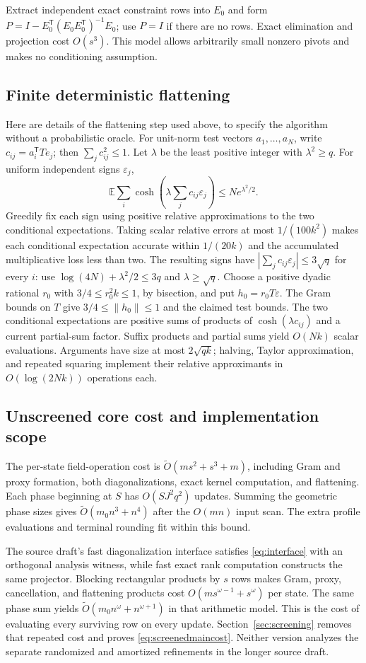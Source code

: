 \documentclass[11pt]{amsart}
\theoremstyle{remark}\newtheorem{remark}[theorem]{Remark}
\newcommand{\eps}{\varepsilon}
\newcommand{\T}{\mathsf T}
\begin{document}
Extract independent exact constraint rows into $E_0$ and form
$P=I-E_0^\T(E_0E_0^\T)^{-1}E_0$; use $P=I$ if there are no rows.
Exact elimination and projection cost $O(s^3)$. This model allows
arbitrarily small nonzero pivots and makes no conditioning assumption.

\subsection{Finite deterministic flattening}
Here are details of the flattening step used above, to specify the
algorithm without a probabilistic oracle. For unit-norm test vectors
$a_1,\ldots,a_N$, write $c_{ij}=a_i^\T T e_j$; then
$\sum_jc_{ij}^2\le1$.
Let $\lambda$ be the least positive integer with $\lambda^2\ge q$.
For uniform independent signs $\eps_j$,
\[
 \mathbb E\sum_i\cosh\!\left(\lambda\sum_jc_{ij}\eps_j\right)
 \le N e^{\lambda^2/2}.
\]
Greedily fix each sign using positive relative approximations to the two
conditional expectations. Taking scalar relative errors at most
$1/(100k^2)$ makes each conditional expectation accurate within
$1/(20k)$ and the accumulated multiplicative loss less than two.
The resulting signs have
$|\sum_jc_{ij}\eps_j|\le3\sqrt q$ for every $i$:
use $\log(4N)+\lambda^2/2\le3q$ and $\lambda\ge\sqrt q$.
Choose a positive dyadic rational $r_0$ with
$3/4\le r_0^2k\le1$, by bisection, and put $h_0=r_0T\eps$.
The Gram bounds on $T$ give $3/4\le\|h_0\|\le1$ and the claimed test bounds.
The two conditional expectations are positive sums of products of
$\cosh(\lambda c_{ij})$ and a current partial-sum factor.
Suffix products and partial sums yield $O(Nk)$ scalar evaluations.
Arguments have size at most $2\sqrt{qk}$; halving, Taylor approximation,
and repeated squaring implement their relative approximants in
$O(\log(2Nk))$ operations each.

\subsection{Unscreened core cost and implementation scope}
The per-state field-operation cost is
$\widetilde O(ms^2+s^3+m)$, including Gram and proxy formation, both
diagonalizations, exact kernel computation, and flattening.
Each phase beginning at $S$ has $O(SJ^2q^2)$ updates.
Summing the geometric phase sizes gives
$\widetilde O(m_0n^3+n^4)$ after the $O(mn)$ input scan.
The extra profile evaluations and terminal rounding fit within this bound.

The source draft's fast diagonalization interface satisfies
\eqref{eq:interface} with an orthogonal analysis witness, while fast exact
rank computation constructs the same projector. Blocking rectangular
products by $s$ rows makes Gram, proxy, cancellation, and flattening
products cost $O(ms^{\omega-1}+s^\omega)$ per state.
The same phase sum yields
$\widetilde O(m_0n^\omega+n^{\omega+1})$ in that arithmetic model.
This is the cost of evaluating every surviving row on every update.
Section~\ref{sec:screening} removes that repeated cost and proves
\eqref{eq:screenedmaincost}. Neither version analyzes the separate
randomized and amortized refinements in the longer source draft.
\end{document}
